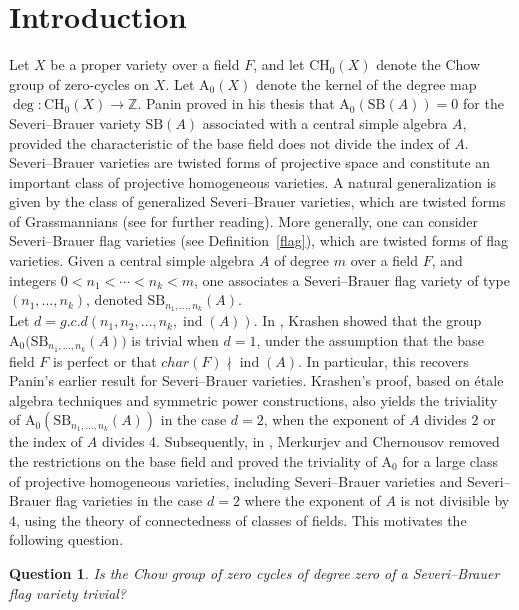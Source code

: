 \documentclass[10pt]{amsart}
\theoremstyle{plain}
\newtheorem{question}[thm]{Question}
\theoremstyle{definition}
\newcommand{\Z}{{\mathbb Z}}
\begin{document}
\section{Introduction}
Let \(X\) be a proper variety over a field \(F\), and let \(\mathrm{CH_0}(X)\) denote the Chow group of zero-cycles on \(X\). Let \(\mathrm{A_0}(X)\) denote the kernel of the degree map \(\deg : \mathrm{CH_0}(X) \rightarrow \Z \). Panin proved in his thesis that \(\mathrm{A_0}(\mathrm{SB}(A))=0\) for the Severi--Brauer variety \(\mathrm{SB}(A)\) associated with a central simple algebra \(A\), provided the characteristic of the base field does not divide the index of \(A\). Severi--Brauer varieties are twisted forms of projective space and constitute an important class of projective homogeneous varieties. A natural generalization is given by the class of generalized Severi--Brauer varieties, which are twisted forms of Grassmannians (see \cite{blanchet} for further reading). More generally, one can consider Severi--Brauer flag varieties (see Definition~\ref{flag}), which are twisted forms of flag varieties. Given a central simple algebra \(A\) of degree \(m\) over a field \(F\), and integers \(0 < n_1 < \cdots < n_k < m\), one associates a Severi--Brauer flag variety of type \((n_1,\ldots,n_k)\), denoted \(\mathrm{SB}_{n_1,\ldots,n_k}(A)\).\\
Let \(d = g.c.d(n_1,n_2,\ldots,n_k,\operatorname{ind}(A))\). In \cite{zerocycle}, Krashen showed that the group \(\mathrm{A_0}\bigl(\mathrm{SB}_{n_1,\ldots,n_k}(A)\bigr)\) is trivial when \(d=1\), under the assumption that the base field \(F\) is perfect or that \(char (F)\nmid \operatorname{ind}(A)\). In particular, this recovers Panin’s earlier result for Severi--Brauer varieties. Krashen's proof, based on étale algebra techniques and symmetric power constructions, also yields the triviality of \(\mathrm{A_0}(\mathrm{SB}_{n_1,\ldots,n_k}(A))\) in the case \(d=2\), when the exponent of \(A\) divides \(2\) or the index of \(A\) divides 4. Subsequently, in \cite{MC}, Merkurjev and Chernousov removed the restrictions on the base field and proved the triviality of \(\mathrm{A_0}\) for a large class of projective homogeneous varieties, including Severi–Brauer varieties and Severi--Brauer flag varieties in the case \(d=2\) where the exponent of \(A\) is not divisible by \(4\), using the theory of connectedness of classes of fields. This motivates the following question.
\begin{question}\label{conjecture}
    Is the Chow group of zero cycles of degree zero of a Severi--Brauer flag variety trivial?
\end{question}
\end{document}
